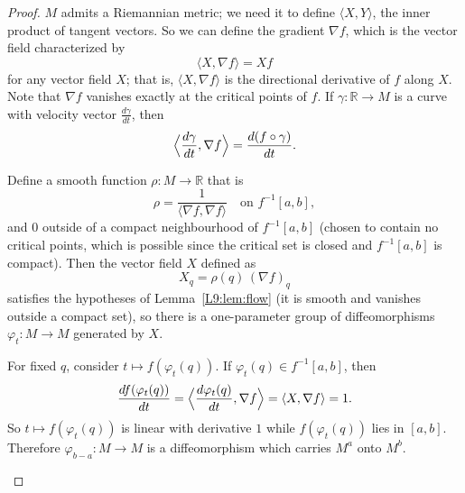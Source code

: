 \documentclass[11pt,openany]{book}
\theoremstyle{plain}
\theoremstyle{definition}
\theoremstyle{remark}
\newcommand{\added}[1]{{\color{addcol}#1}}
\newcommand{\fixed}[1]{\marginpar{\raggedright\scriptsize\color{flagcol}\textbf{Fix:} #1}}
\newcommand{\orig}[1]{\marginpar{\raggedright\scriptsize\color{gray}#1}}
\newcommand{\R}{\mathbb{R}}
\begin{document}
\begin{proof}
$M$ admits a \added{Riemannian} metric; we need it to define $\langle X,Y\rangle$, the inner product
of tangent vectors. So we can define the gradient $\nabla f$, which is the vector field
characterized by
\[
  \langle X,\nabla f\rangle = Xf
\]
for any vector field $X$; that is, $\langle X,\nabla f\rangle$ is the directional derivative of $f$
along $X$. Note that $\nabla f$ vanishes exactly at the critical points of $f$.
If $\gamma\colon\R\to M$ is a curve with velocity vector $\frac{d\gamma}{dt}$, then
\fixed{notes: $\gamma\colon\R\to\R$}
\[
  \Bigl\langle\frac{d\gamma}{dt},\nabla f\Bigr\rangle=\frac{d(f\circ\gamma)}{dt}.
\]

Define a smooth function $\rho\colon M\to\R$ that is
\[
  \rho=\frac{1}{\langle\nabla f,\nabla f\rangle}\quad\text{on } f^{-1}[a,b],
\]
and $0$ outside of a compact neighbourhood of $f^{-1}[a,b]$
\added{(chosen to contain no critical points, which is possible since the critical set is closed
and $f^{-1}[a,b]$ is compact)}.
Then the vector field $X$ defined as
\[
  X_q=\rho(q)\,(\nabla f)_q
\]
satisfies the hypotheses of Lemma~\ref{L9:lem:flow} (it is smooth and vanishes outside a compact
set), so there is a one-parameter group of diffeomorphisms $\varphi_t\colon M\to M$ generated by $X$.

For fixed $q$, consider $t\mapsto f(\varphi_t(q))$. If $\varphi_t(q)\in f^{-1}[a,b]$, then
\[
  \frac{d f(\varphi_t(q))}{dt}=\Bigl\langle\frac{d\varphi_t(q)}{dt},\nabla f\Bigr\rangle
  =\langle X,\nabla f\rangle = 1 .
\]
So $t\mapsto f(\varphi_t(q))$ is linear with derivative $1$ while $f(\varphi_t(q))$ lies in $[a,b]$.
Therefore $\varphi_{b-a}\colon M\to M$ is a diffeomorphism which carries $M^a$
\added{onto} $M^b$.

\begin{center}
\end{center}
\orig{p.\,15: sketch of this flow}


\end{proof}
\end{document}
